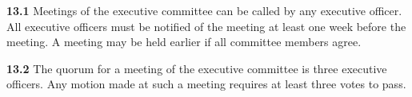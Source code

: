 \vspace{1em}

\textbf{13.1} Meetings of the executive committee can be called by any executive officer. All executive officers must be notified of the meeting at least one week before the meeting. A meeting may be held earlier if all committee members agree.

\textbf{13.2} The quorum for a meeting of the executive committee is three executive officers. Any motion made at such a meeting requires at least three votes to pass.
